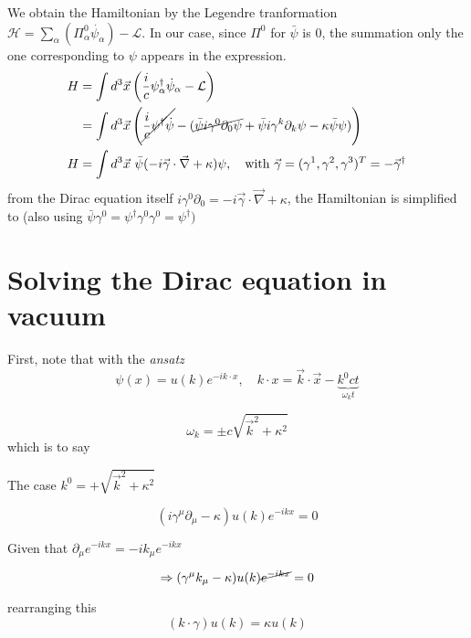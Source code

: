 \documentclass[11pt]{article}
\newcommand{\lag}{\mathcal{L}}
\newcommand{\ham}{\mathcal{H}}
\begin{document}
	We obtain the Hamiltonian by the Legendre tranformation $\ham = \sum_\alpha \left( \Pi^0_\alpha \dot{\psi_\alpha} \right) - \lag$. In our case, since $\Pi^0$ for $\bar{\psi}$ is 0, the summation only the one corresponding to $\psi$ appears in the expression.
	\begin{align*}
		H &= \int d^3 \vec{x} \left( \frac{i}{c}\psi^\dagger_\alpha \dot{\psi}_\alpha - \lag \right)\\
			& = \int d^3 \vec{x} \left( \cancel{ \frac{i}{c}\psi^\dagger \dot{\psi} }- (  \cancel{ \bar{\psi}i\gamma^0 \partial_0\psi } + \bar{\psi} i \gamma^k \partial_k \psi - \kappa \bar{\psi} \psi) \right)\\
		H &= \int d^3 \vec{x}\ \bar{\psi} (-i\vec{\gamma}\cdot \vec{\nabla} + \kappa)\psi, \quad \text{with}\ \vec{\gamma} = (\gamma^1, \gamma^2, \gamma^3)^T = -\vec{\gamma}^\dagger
	\end{align*}
	from the Dirac equation itself $i\gamma^0\partial_0 = -i\vec{\gamma}\cdot\vec{\nabla} + \kappa$, the Hamiltonian is simplified to (also using $\bar{\psi}\gamma^0 = \psi^\dagger \gamma^0 \gamma^0 = \psi^\dagger)$
	\begin{center}
	\end{center}
	
	
	\section*{Solving the Dirac equation in vacuum}
	
	First, note that with the {\it ansatz} \[ \psi(x) = u(k) e^{-ik\cdot x},\quad k\cdot x = \vec{k}\cdot\vec{x} - \underbrace{k^0 ct}_{\omega_k t} \]
	
	\[ \omega_k = \pm c\sqrt{\vec{k}^2 + \kappa^2 }\]
	which is to say
	
	\begin{center} \end{center}
	
	
	The case $k^0 = + \sqrt{\vec{k}^2 + \kappa^2}$
	
	\[ (i\gamma^\mu\partial_\mu - \kappa) u(k) e^{-ikx} = 0\]
	
	Given that $\partial_\mu e^{-ikx} = -ik_\mu e^{-ikx}$
	
	\[ \Rightarrow (\gamma^\mu k_\mu - \kappa) u(k) \cancel{e^{-ikx}} = 0\]
	
	rearranging this
	\[ (k \cdot \gamma) u(k) = \kappa u(k)\]
	
\end{document}
